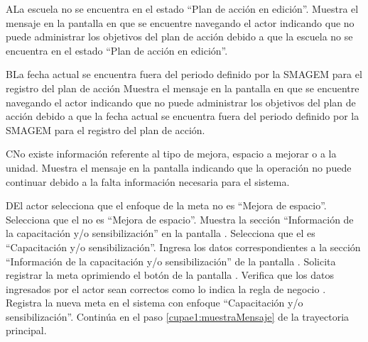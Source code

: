 \begin{UCtrayectoriaA}{A}{La escuela no se encuentra en el estado ``Plan de acción en edición''.}
    \UCpaso[\UCsist] Muestra el mensaje  en la pantalla en que se encuentre navegando el actor indicando que no puede administrar los objetivos del plan de acción debido a que la escuela no se encuentra en el estado ``Plan de acción en edición''. 
 \end{UCtrayectoriaA}
 
   \begin{UCtrayectoriaA}{B}{La fecha actual se encuentra fuera del periodo definido por la SMAGEM para el registro del plan de acción}
    \UCpaso[\UCsist] Muestra el mensaje  en la pantalla en que se encuentre navegando el actor indicando que no puede administrar los objetivos del plan de acción debido a que la fecha actual se encuentra fuera del periodo definido por la SMAGEM para el registro del plan de acción.
 \end{UCtrayectoriaA} 
 
 
\begin{UCtrayectoriaA}{C}{No existe información referente al tipo de mejora, espacio a mejorar o a la unidad.}
	\UCpaso[\UCsist] Muestra el mensaje  en la pantalla  indicando que la operación no puede continuar debido a la falta información necesaria para el sistema.
\end{UCtrayectoriaA}

\begin{UCtrayectoriaA}{D}{El actor selecciona que el enfoque de la meta no es ``Mejora de espacio''.}
	\UCpaso[\UCactor] Selecciona que el  no es ``Mejora de espacio''. 
	\UCpaso[\UCsist] Muestra la sección ``Información de la capacitación y/o sensibilización'' en la pantalla .
	\UCpaso[\UCactor] Selecciona que el  es ``Capacitación y/o sensibilización''. 
	\UCpaso[\UCactor] Ingresa los datos correspondientes a la sección ``Información de la capacitación y/o sensibilización'' de la pantalla .
	\UCpaso[\UCactor] Solicita registrar la meta oprimiendo el botón  de la pantalla .  
	\UCpaso[\UCsist] Verifica que los datos ingresados por el actor sean correctos como lo indica la regla de negocio .   
	\UCpaso[\UCsist] Registra la nueva meta en el sistema con enfoque ``Capacitación y/o sensibilización''.
	\UCpaso[] Continúa en el paso \ref{cupae1:muestraMensaje} de la trayectoria principal.
\end{UCtrayectoriaA}

